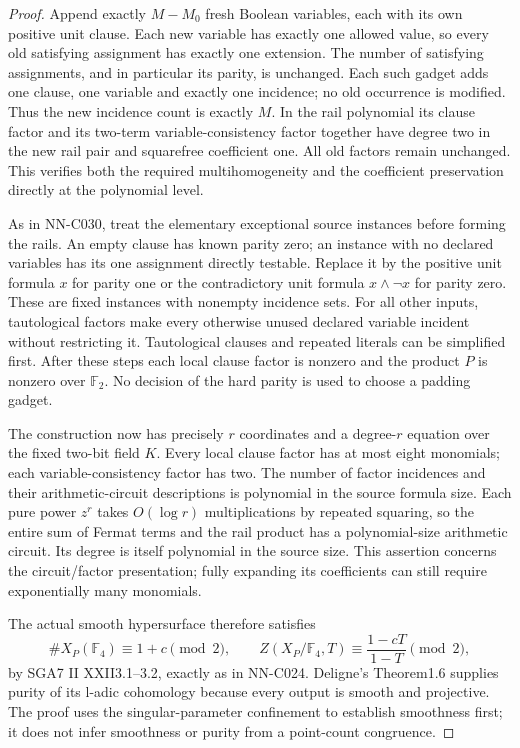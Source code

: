 \begin{proof}
Append exactly $M-M_0$ fresh Boolean variables, each with its own positive unit clause. Each new variable has exactly one allowed value, so every old satisfying assignment has exactly one extension. The number of satisfying assignments, and in particular its parity, is unchanged. Each such gadget adds one clause, one variable and exactly one incidence; no old occurrence is modified. Thus the new incidence count is exactly $M$. In the rail polynomial its clause factor and its two-term variable-consistency factor together have degree two in the new rail pair and squarefree coefficient one. All old factors remain unchanged. This verifies both the required multihomogeneity and the coefficient preservation directly at the polynomial level.

As in NN-C030, treat the elementary exceptional source instances before forming the rails. An empty clause has known parity zero; an instance with no declared variables has its one assignment directly testable. Replace it by the positive unit formula $x$ for parity one or the contradictory unit formula $x\wedge\neg x$ for parity zero. These are fixed instances with nonempty incidence sets. For all other inputs, tautological factors make every otherwise unused declared variable incident without restricting it. Tautological clauses and repeated literals can be simplified first. After these steps each local clause factor is nonzero and the product $P$ is nonzero over $\mathbb F_2$. No decision of the hard parity is used to choose a padding gadget.

The construction now has precisely $r$ coordinates and a degree-$r$ equation over the fixed two-bit field $K$. Every local clause factor has at most eight monomials; each variable-consistency factor has two. The number of factor incidences and their arithmetic-circuit descriptions is polynomial in the source formula size. Each pure power $z^r$ takes $O(\log r)$ multiplications by repeated squaring, so the entire sum of Fermat terms and the rail product has a polynomial-size arithmetic circuit. Its degree is itself polynomial in the source size. This assertion concerns the circuit/factor presentation; fully expanding its coefficients can still require exponentially many monomials.

The actual smooth hypersurface therefore satisfies
\[
 \#X_P(\mathbb F_4)\equiv1+c\pmod2,
 \qquad
 Z(X_P/\mathbb F_4,T)\equiv\frac{1-cT}{1-T}\pmod2,
\]
by SGA7 II XXII3.1--3.2, exactly as in NN-C024. Deligne's Theorem1.6 supplies purity of its l-adic cohomology because every output is smooth and projective. The proof uses the singular-parameter confinement to establish smoothness first; it does not infer smoothness or purity from a point-count congruence.


\end{proof}
